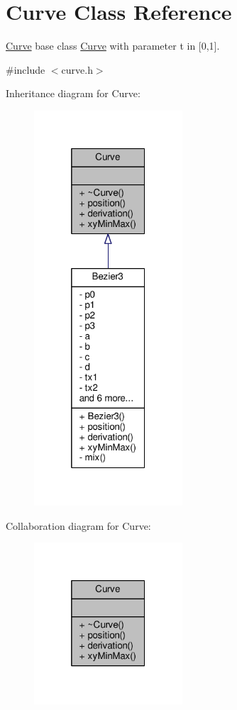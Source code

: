 \hypertarget{classCurve}{}\section{Curve Class Reference}
\label{classCurve}


\hyperlink{classCurve}{Curve} base class \hyperlink{classCurve}{Curve} with parameter t in \mbox{[}0,1\mbox{]}.  




{\ttfamily \#include $<$curve.\+h$>$}



Inheritance diagram for Curve\+:
\nopagebreak
\begin{figure}[H]
\begin{center}
\leavevmode
\includegraphics[width=157pt]{classCurve__inherit__graph}
\end{center}
\end{figure}


Collaboration diagram for Curve\+:
\nopagebreak
\begin{figure}[H]
\begin{center}
\leavevmode
\includegraphics[width=157pt]{classCurve__coll__graph}
\end{center}
\end{figure}
